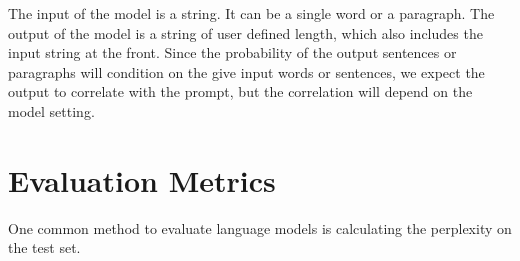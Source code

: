 \documentclass[10pt]{article}
\begin{document}
The input of the model is a string. It can be a single word or a paragraph. The output of the model is a string of user defined length, which also includes the input string at the front. Since the probability of the output sentences or paragraphs will condition on the give input words or sentences, we expect the output to correlate with the prompt, but the correlation will depend on the model setting.

\section{Evaluation Metrics}

One common method to evaluate language models is calculating the perplexity on the test set.

\clearpage

\printbibliography 
\end{document}
